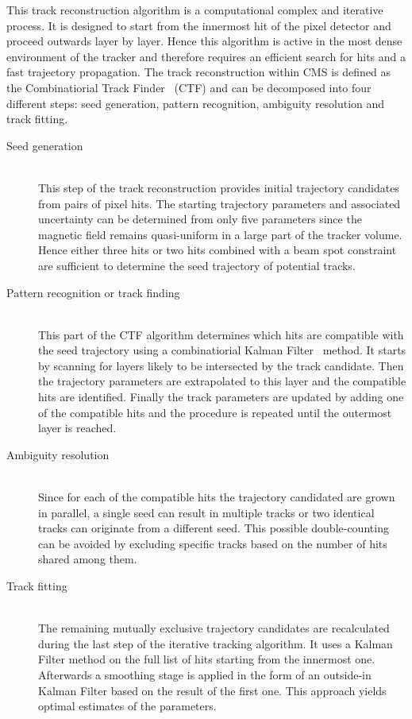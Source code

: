 This track reconstruction algorithm is a computational complex and iterative process. It is designed to start from the innermost hit of the pixel detector and proceed outwards layer by layer. Hence this algorithm is active in the most dense environment of the tracker and therefore requires an efficient search for hits and a fast trajectory propagation. The track reconstruction within CMS is defined as the Combinatiorial Track Finder~\cite{TrackAndPVReco} (CTF) and can be decomposed into four different steps: seed generation, pattern recognition, ambiguity resolution and track fitting.
\begin{myindentpar}
  \begin{description}
    \item[Seed generation] \hfill \\
    This step of the track reconstruction provides initial trajectory candidates from pairs of pixel hits. 
    The starting trajectory parameters and associated uncertainty can be determined from only five parameters since the magnetic field remains quasi-uniform in a large part of the tracker volume. Hence either three hits or two hits combined with a beam spot constraint are sufficient to determine the seed trajectory of potential tracks.
    \item[Pattern recognition or track finding] \hfill \\
    This part of the CTF algorithm determines which hits are compatible with the seed trajectory using a combinatiorial Kalman Filter~\cite{KalmanFilter} method.
    It starts by scanning for layers likely to be intersected by the track candidate. Then the trajectory parameters are extrapolated to this layer and the compatible hits are identified. Finally the track parameters are updated by adding one of the compatible hits and the procedure is repeated until the outermost layer is reached.
    \item[Ambiguity resolution] \hfill \\
    Since for each of the compatible hits the trajectory candidated are grown in parallel, a single seed can result in multiple tracks or two identical tracks can originate from a different seed. This possible double-counting can be avoided by excluding specific tracks based on the number of hits shared among them. 
    \item[Track fitting] \hfill \\
    The remaining mutually exclusive trajectory candidates are recalculated during the last step of the iterative tracking algorithm. It uses a Kalman Filter method on the full list of hits starting from the innermost one. Afterwards a smoothing stage is applied in the form of an outside-in Kalman Filter based on the result of the first one. This approach yields optimal estimates of the parameters.
  \end{description}
\end{myindentpar}
